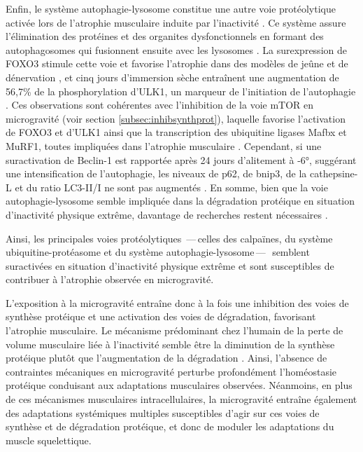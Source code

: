 \documentclass[11pt]{report}
\begin{document}
Enfin, le système autophagie-lysosome constitue une autre voie protéolytique activée lors de l'atrophie musculaire induite par l'inactivité \parencite{Sandri2010Apr,Bechet2005Oct}. Ce système assure l'élimination des protéines et des organites dysfonctionnels en formant des autophagosomes qui fusionnent ensuite avec les lysosomes \parencite{Sandri2010Apr}. La surexpression de FOXO3 stimule cette voie et favorise l'atrophie dans des modèles de jeûne et de dénervation \parencite{Mammucari2007Dec}, et cinq jours d'immersion sèche entraînent une augmentation de 56,7\% de la phosphorylation d'ULK1, un marqueur de l'initiation de l'autophagie \parencite{fovet_early_2021}. Ces observations sont cohérentes avec l'inhibition de la voie mTOR en microgravité (voir section \ref{subsec:inhibsynthprot}), laquelle favorise l'activation de FOXO3 et d'ULK1 ainsi que la transcription des ubiquitine ligases Mafbx et MuRF1, toutes impliquées dans l'atrophie musculaire \parencite{Gao2018Mar}. Cependant, si une suractivation de Beclin-1 est rapportée après 24 jours d'alitement à -6°, suggérant une intensification de l'autophagie, les niveaux de p62, de bnip3, de la cathepsine-L et du ratio LC3-II/I ne sont pas augmentés \parencite{brocca_time_2012}. En somme, bien que la voie autophagie-lysosome semble impliquée dans la dégradation protéique en situation d'inactivité physique extrême, davantage de recherches restent nécessaires \parencite{bosutti_microgravity-induced_2025}.

Ainsi, les principales voies protéolytiques \,---\,celles des calpaïnes, du système ubiquitine-protéasome et du système autophagie-lysosome\,---\,\-\ semblent suractivées en situation d'inactivité physique extrême et sont susceptibles de contribuer à l'atrophie observée en microgravité.

\medskip L'exposition à la microgravité entraîne donc à la fois une inhibition des voies de synthèse protéique et une activation des voies de dégradation, favorisant l'atrophie musculaire. Le mécanisme prédominant chez l'humain de la perte de volume musculaire liée à l'inactivité semble être la diminution de la synthèse protéique plutôt que l'augmentation de la dégradation \parencite{Ferrando1996Apr,Gao2018Mar}. Ainsi, l'absence de contraintes mécaniques en microgravité perturbe profondément l'homéostasie protéique conduisant aux adaptations musculaires observées. Néanmoins, en plus de ces mécanismes musculaires intracellulaires, la microgravité entraîne également des adaptations systémiques multiples susceptibles d'agir sur ces voies de synthèse et de dégradation protéique, et donc de moduler les adaptations du muscle squelettique.
\end{document}
